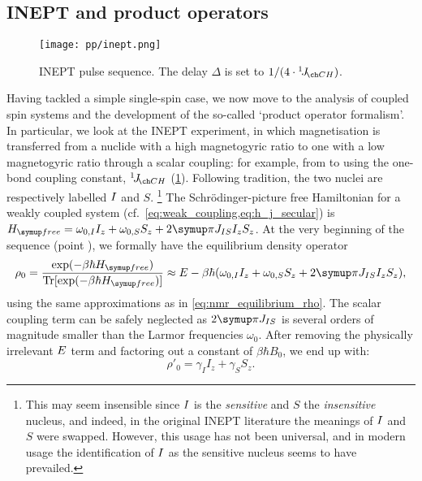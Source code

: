 \subsection{INEPT and product operators}
\label{subsec:theory__inept}

\begin{figure}[htbp]
    \centering
    \texttt{[image: pp/inept.png]}%
    \caption[INEPT pulse sequence]{
        INEPT pulse sequence.
        The delay $\Delta$ is set to $1/(4 \cdot \oneJ{CH})$.
    }
    \label{fig:inept}
\end{figure}

Having tackled a simple single-spin case, we now move to the analysis of coupled spin systems and the development of the so-called `product operator formalism'.\autocite{Sorensen1984PNMRS}
In particular, we look at the INEPT experiment\autocite{Morris1979JACS,Morris1980JACS}, in which magnetisation is transferred from a nuclide with a high magnetogyric ratio to one with a low magnetogyric ratio through a scalar coupling: for example, from \proton{} to \carbon{} using the one-bond coupling constant, $\oneJ{CH}$ (\cref{fig:inept}).
Following tradition, the two nuclei are respectively labelled $I\/$ and $S$.%
\footnote{This may seem insensible since $I\/$ is the \textit{sensitive} and $S$ the \textit{insensitive} nucleus, and indeed, in the original INEPT literature\autocite{Morris1979JACS} the meanings of $I\/$ and $S$ were swapped. However, this usage has not been universal\autocite{Pines1972JCP}, and in modern usage the identification of $I\/$ as the sensitive nucleus seems to have prevailed.}
The Schr\"odinger-picture free Hamiltonian for a weakly coupled system (cf.\ \cref{eq:weak_coupling,eq:h_j_secular}) is $\Hfree = \omega_{0,I} I_z + \omega_{0,S} S_z + 2\cpi J_{IS} I_z S_z$.
At the very beginning of the sequence (point ), we formally have the equilibrium density operator
\begin{equation}
    \label{eq:density_eqm_heteronuclear_full}
    \rho_0 = \frac{\exp(-\beta\hbar\Hfree)}{\Tr[\exp(-\beta\hbar\Hfree)]}
    \approx E - \beta\hbar (\omega_{0,I} I_z + \omega_{0,S} S_z + 2\cpi J_{IS} I_z S_z),
\end{equation}
using the same approximations as in \cref{eq:nmr_equilibrium_rho}.
The scalar coupling term can be safely neglected as $2\cpi J_{IS}$ is several orders of magnitude smaller than the Larmor frequencies $\omega_0$.
After removing the physically irrelevant $E\/$ term and factoring out a constant of $\beta\hbar B_0$, we end up with:
\begin{equation}
    \label{eq:density_eqm_heteronuclear_simplified}
    \rho'_0 = \gamma_I I_z + \gamma_S S_z.
\end{equation}
